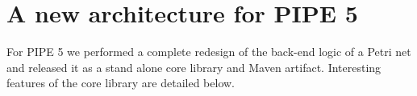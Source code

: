 \section{A new architecture for PIPE 5}
For PIPE 5 we performed a complete redesign of the back-end logic of a Petri net and released it as a stand alone core library and Maven artifact. Interesting features of the core library are detailed below.





